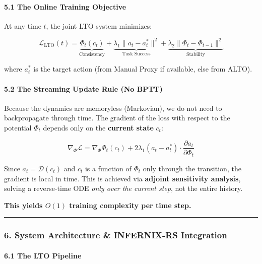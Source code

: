\documentclass[
  11pt,
  a4paper,
]{article}
\begin{document}
\paragraph{5.1 The Online Training
Objective}\label{the-online-training-objective}

At any time \(t\), the joint LTO system minimizes:

\[\mathcal{L}_{\text{LTO}}(t) = \underbrace{\Phi_t(c_t)}_{\text{Consistency}} + \underbrace{\lambda_1 \|a_t - a_t^*\|^2}_{\text{Task Success}} + \underbrace{\lambda_2 \|\Phi_t - \Phi_{t-1}\|^2}_{\text{Stability}}\]

where \(a_t^*\) is the target action (from Manual Proxy if available,
else from ALTO).

\paragraph{5.2 The Streaming Update Rule (No
BPTT)}\label{the-streaming-update-rule-no-bptt}

Because the dynamics are memoryless (Markovian), we do not need to
backpropagate through time. The gradient of the loss with respect to the
potential \(\Phi_t\) depends only on the \textbf{current state} \(c_t\):

\[\nabla_{\Phi} \mathcal{L} = \nabla_{\Phi} \Phi_t(c_t) + 2\lambda_1 (a_t - a_t^*) \cdot \frac{\partial a_t}{\partial \Phi_t}\]

Since \(a_t = \mathcal{D}(c_t)\) and \(c_t\) is a function of \(\Phi_t\)
only through the transition, the gradient is local in time. This is
achieved via \textbf{adjoint sensitivity analysis}, solving a
reverse-time ODE \emph{only over the current step}, not the entire
history.

\textbf{This yields \(O(1)\) training complexity per time step.}

\begin{center}\rule{0.5\linewidth}{0.5pt}\end{center}

\subsubsection{6. System Architecture \& INFERNIX-RS
Integration}\label{system-architecture-infernix-rs-integration}

\paragraph{6.1 The LTO Pipeline}\label{the-lto-pipeline}
\end{document}
